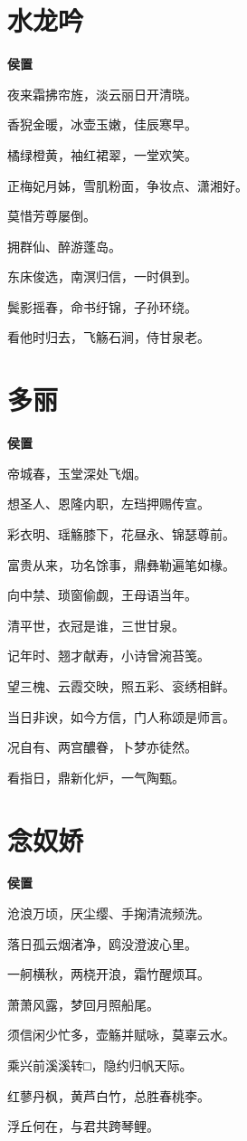 \documentclass[12pt,a4paper]{ctexbook}
\begin{document}
\section{水龙吟}
\textbf{侯置}\par\vspace{0.5em}
夜来霜拂帘旌，淡云丽日开清晓。\par
香猊金暖，冰壶玉嫩，佳辰寒早。\par
橘绿橙黄，袖红裙翠，一堂欢笑。\par
正梅妃月姊，雪肌粉面，争妆点、潇湘好。\par
莫惜芳尊屡倒。\par
拥群仙、醉游蓬岛。\par
东床俊选，南溟归信，一时俱到。\par
鬓影摇春，命书纡锦，子孙环绕。\par
看他时归去，飞觞石涧，侍甘泉老。\par

\section{多丽}
\textbf{侯置}\par\vspace{0.5em}
帝城春，玉堂深处飞烟。\par
想圣人、恩隆内职，左珰押赐传宣。\par
彩衣明、瑶觞膝下，花昼永、锦瑟尊前。\par
富贵从来，功名馀事，鼎彝勒遍笔如椽。\par
向中禁、琐窗偷觑，王母语当年。\par
清平世，衣冠是谁，三世甘泉。\par
记年时、翘才献寿，小诗曾涴苔笺。\par
望三槐、云霞交映，照五彩、衮绣相鲜。\par
当日非谀，如今方信，门人称颂是师言。\par
况自有、两宫醲眷，卜梦亦徒然。\par
看指日，鼎新化炉，一气陶甄。\par

\section{念奴娇}
\textbf{侯置}\par\vspace{0.5em}
沧浪万顷，厌尘缨、手掬清流频洗。\par
落日孤云烟渚净，鸥没澄波心里。\par
一舸横秋，两桡开浪，霜竹醒烦耳。\par
萧萧风露，梦回月照船尾。\par
须信闲少忙多，壶觞并赋咏，莫辜云水。\par
乘兴前溪溪转□，隐约归帆天际。\par
红蓼丹枫，黄芦白竹，总胜春桃李。\par
浮丘何在，与君共跨琴鲤。\par
\end{document}

